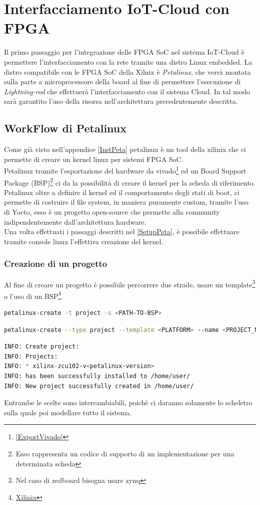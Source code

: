 \chapter{Interfacciamento IoT-Cloud con FPGA}
\label{Linux}
Il primo passaggio per l'integrazione delle FPGA SoC nel sistema IoT-Cloud è permettere l'interfacciamento con la rete tramite una distro Linux embedded. La distro compatibile con le FPGA SoC della Xilnix è \textit{Petalinux}, che verrà montata sulla parte a microprocessore della board al fine di permettere l'esecuzione di \textit{Lightning-rod} che effettuerà l'interfacciamento con il sistema Cloud. In tal modo sarà garantito l'uso della risorsa nell'architettura precedentemente descritta.
\section{WorkFlow di Petalinux}
Come già visto nell'appendice \ref{InstPeta} petalinux è un tool della xilinix che ci permette di creare un kernel linux per sistemi FPGA SoC.\\
Petalinux tramite l'esportazione del hardware da vivado\footnote{\ref{ExportVivado}} ed un Board Support Package (BSP)\footnote{Esso rappresenta un codice di supporto di un implementazione per una determinata scheda} ci da la possibilità di creare il kernel per la scheda di riferimento.\\
Petalinux oltre a definire il kernel ed il comportamento degli stati di boot, ci permette di costruire il file system, in maniera puramente custom, tramite l'uso di Yocto, esso è un progetto open-source che permette alla community indipendentemente dall'architettura hardware.\\
Una volta effettuati i passaggi descritti nel \ref{SetupPeta}, è possibile effettuare tramite console linux l'effettiva creazione del kernel.
\subsection{Creazione di un progetto}
Al fine di creare un progetto è possibile percorrere due strade, usare un template\footnote{Nel caso di zedboard bisogna usare zynq} o l'uso di un BSP\footnote{\href{https://www.xilinx.com/member/forms/download/xef.html?filename=avnet-digilent-zedboard-v2021.2-final.bsp}{Xilinix}}.
\begin{lstlisting}[language=sh, label=lst:sh, caption={Comando creazione progetto con BSP}]
petalinux-create -t project -s <PATH-TO-BSP>
\end{lstlisting}
\begin{lstlisting}[language=sh, label=lst:sh, caption={Comando creazione progetto con il template}]
petalinux-create --type project --template <PLATFORM> --name <PROJECT_NAME> 
\end{lstlisting}
\begin{lstlisting}[language=sh, label=lst:sh, caption={Output atteso}]
INFO: Create project:
INFO: Projects:
INFO: * xilinx-zcu102-v<petalinux-version>
INFO: has been successfully installed to /home/user/
INFO: New project successfully created in /home/user/
\end{lstlisting}
Entrambe le scelte sono intercambiabili, poichè ci daranno solamente lo scheletro sulla quale poi modellare tutto il sistema.
